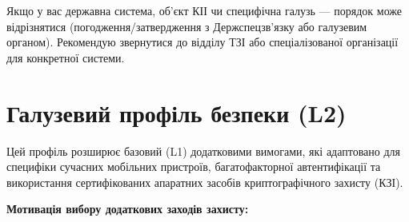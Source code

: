\documentclass{article}
\begin{document}
Якщо у вас державна система, об’єкт КІІ чи специфічна галузь — порядок може відрізнятися (погодження/затвердження
з Держспецзв’язку або галузевим органом). Рекомендую звернутися до відділу ТЗІ або спеціалізованої організації для конкретної системи.

\section{Галузевий профіль безпеки (L2)}

Цей профіль розширює базовий (L1) додатковими вимогами, які адаптовано для специфіки сучасних мобільних пристроїв, багатофакторної автентифікації та використання сертифікованих апаратних засобів криптографічного захисту (КЗІ).

\textbf{Мотивація вибору додаткових заходів захисту:}
\end{document}
